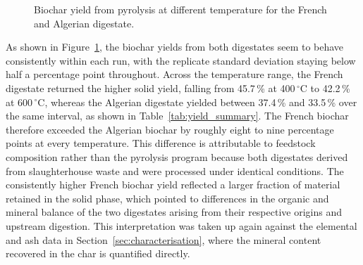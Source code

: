 \begin{figure}[ht]
\centering
{}
\caption{Biochar yield from pyrolysis at different temperature for the French and
Algerian digestate.}
\label{fig:pyrolysis-yield}
\end{figure}


\newpage

As shown in Figure~\ref{fig:pyrolysis-yield}, the biochar yields from both digestates seem to behave consistently within each run,  with the replicate standard deviation staying below half a percentage point throughout. Across the temperature range, the French digestate returned the higher solid yield, falling from 45.7\,\% at 400\,$^{\circ}$C to 42.2\,\% at 600\,$^{\circ}$C, whereas the Algerian digestate yielded between 37.4\,\% and 33.5\,\% over the same interval, as shown in Table~\ref{tab:yield_summary}. The French biochar therefore exceeded the Algerian biochar by roughly eight to nine percentage points at every temperature. This difference is attributable to feedstock composition rather than the pyrolysis program because both digestates derived from slaughterhouse waste and were processed under identical conditions. The consistently higher French biochar yield reflected a larger fraction of material retained in the solid phase, which pointed to differences in the organic and mineral balance of the two digestates arising from their respective origins and upstream digestion. This interpretation was taken up again against the elemental and ash data in Section~\ref{sec:characterisation},
where the mineral content recovered in the char is quantified directly.

